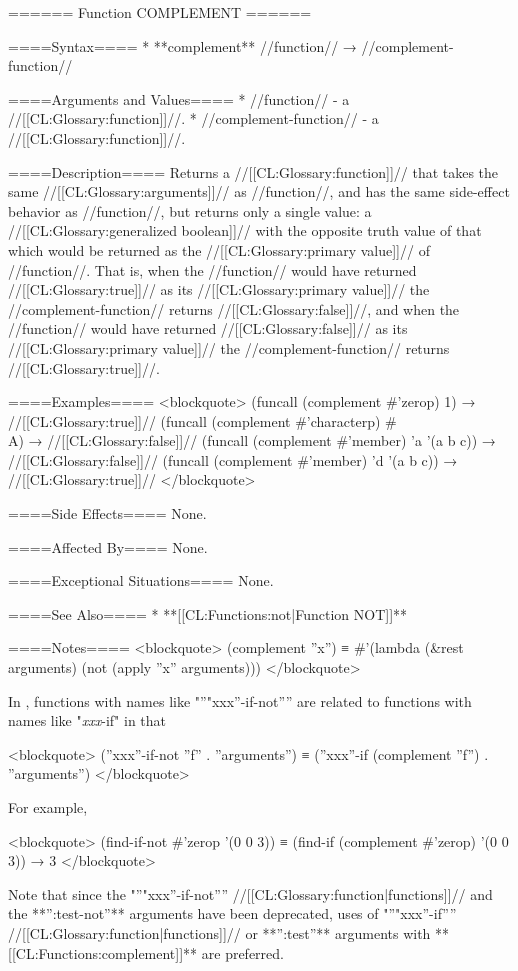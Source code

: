 ====== Function COMPLEMENT ======

====Syntax====
  * **complement** //function// → //complement-function//

====Arguments and Values====
  * //function// - a //[[CL:Glossary:function]]//.
  * //complement-function// - a //[[CL:Glossary:function]]//.

====Description====
Returns a //[[CL:Glossary:function]]// that takes the same //[[CL:Glossary:arguments]]// as //function//, and has the same side-effect behavior as //function//, but returns only a single value: a //[[CL:Glossary:generalized boolean]]// with the opposite truth value of that which would be returned as the //[[CL:Glossary:primary value]]// of //function//. That is, when the //function// would have returned //[[CL:Glossary:true]]// as its //[[CL:Glossary:primary value]]// the //complement-function// returns //[[CL:Glossary:false]]//, and when the //function// would have returned //[[CL:Glossary:false]]// as its //[[CL:Glossary:primary value]]// the //complement-function// returns //[[CL:Glossary:true]]//.

====Examples====
<blockquote> (funcall (complement #'zerop) 1) → //[[CL:Glossary:true]]// (funcall (complement #'characterp) #\\A) → //[[CL:Glossary:false]]// (funcall (complement #'member) 'a '(a b c)) → //[[CL:Glossary:false]]// (funcall (complement #'member) 'd '(a b c)) → //[[CL:Glossary:true]]// </blockquote>

====Side Effects====
None.

====Affected By====
None.

====Exceptional Situations====
None.

====See Also====
  * **[[CL:Functions:not|Function NOT]]**

====Notes====
<blockquote> (complement ''x'') ≡ #'(lambda (&rest arguments) (not (apply ''x'' arguments))) </blockquote>

In \clisp, functions with names like "''"xxx''-if-not'''' are related to functions with names like "\f{{\it xxx}-if}" in that

<blockquote> (''xxx''-if-not ''f'' . ''arguments'') ≡ (''xxx''-if (complement ''f'') . ''arguments'') </blockquote>

For example,

<blockquote> (find-if-not #'zerop '(0 0 3)) ≡ (find-if (complement #'zerop) '(0 0 3)) → 3 </blockquote>

Note that since the "''"xxx''-if-not'''' //[[CL:Glossary:function|functions]]// and the **'':test-not''** arguments have been deprecated, uses of "''"xxx''-if'''' //[[CL:Glossary:function|functions]]// or **'':test''** arguments with **[[CL:Functions:complement]]** are preferred.



